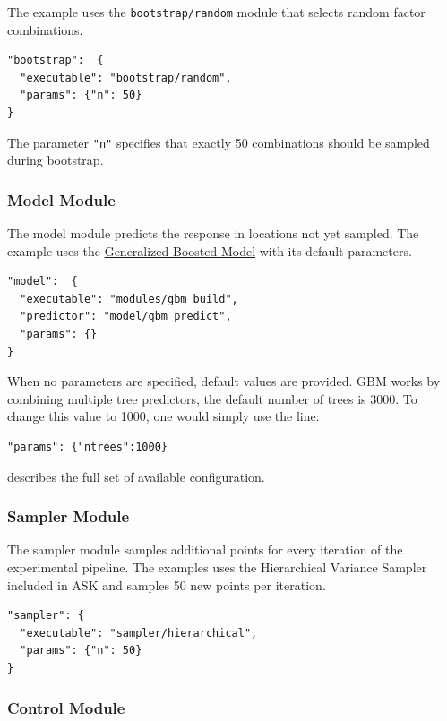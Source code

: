 The example uses the \texttt{bootstrap/random} module that selects random factor combinations.

\begin{verbatim}
"bootstrap":  {
  "executable": "bootstrap/random",
  "params": {"n": 50}
}
\end{verbatim}

The parameter \texttt{"n"} specifies that exactly 50 combinations should be sampled during bootstrap.

\subsubsection{Model Module}

The model module predicts the response in locations not yet sampled.
The example uses the \href{http://cran.r-project.org/web/packages/gbm/}{Generalized Boosted Model} with its default parameters.

\begin{verbatim}
"model":  {
  "executable": "modules/gbm_build",
  "predictor": "model/gbm_predict",
  "params": {}
}
\end{verbatim}

When no parameters are specified, default values are provided.
GBM works by combining multiple tree predictors, the default number of trees is 3000.
To change this value to 1000, one would simply use the line:

\begin{verbatim}
"params": {"ntrees":1000}
\end{verbatim}

 describes the full set of available configuration.

\subsubsection{Sampler Module}

The sampler module samples additional points for every iteration of the experimental pipeline.
The examples uses the Hierarchical Variance Sampler included in ASK and samples 50 new points per iteration.

\begin{verbatim}
"sampler": {
  "executable": "sampler/hierarchical",
  "params": {"n": 50}
}
\end{verbatim}

\subsubsection{Control Module}

